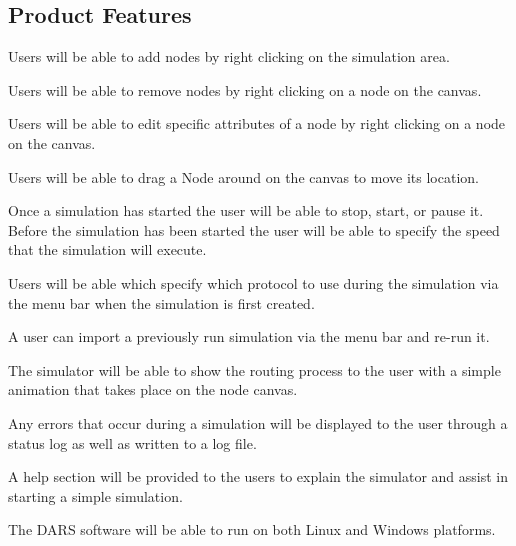 \documentclass[a4paper,11pt,titlepage]{article}
\begin{document}
\subsection{Product Features}
\begin{description}[\breaklabel]
 \item[Adding Nodes] Users will be able to add nodes by right clicking on the simulation area.
 \item[Deleting Nodes] Users will be able to remove nodes by right clicking on a node on the
canvas.
 \item[Editing Node] Users will be able to edit specific attributes of a node by right clicking
on a node on the canvas.
 \item[Moving Nodes] Users will be able to drag a Node around on the canvas to move its
location.
 \item[Interactive Simulation] Once a simulation has started the user will be able to stop,
start, or pause it. Before the simulation has been started the user will be able to
specify the speed that the simulation will execute.
 \item[Dynamic routing] Users will be able which specify which protocol to use during the
simulation via the menu bar when the simulation is first created.
 \item[Replaying Simulation] A user can import a previously run simulation via the menu bar
and re-run it.
 \item[Appealing Graphical Animations] The simulator will be able to show the routing
process to the user with a simple animation that takes place on the node canvas.
 \item[Error Handling] Any errors that occur during a simulation will be displayed to the user
through a status log as well as written to a log file.
 \item[User Help] A help section will be provided to the users to explain the simulator and
assist in starting a simple simulation.
 \item[Platform Independence] The DARS software will be able to run on both Linux and
Windows platforms.

\end{description}
\end{document}
